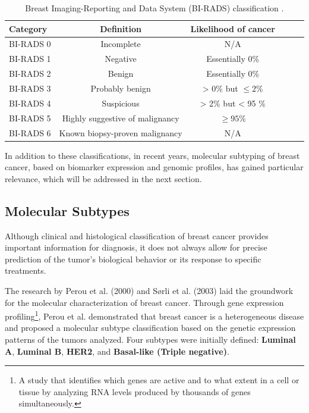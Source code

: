 \documentclass[a4paper,10pt]{book}
\begin{document}
\begin{table}[h!]
	\caption{Breast Imaging-Reporting and Data System (BI-RADS) classification \cite{noauthor_bi-rads_2025}.}
	\centering
	\begin{tabular}{lccccc}
		\toprule
		\textbf{Category} & \textbf{Definition} & \textbf{Likelihood of cancer}\\
		\midrule
		BI-RADS 0        & Incomplete                         & N/A \\
		BI-RADS 1        & Negative                           & Essentially 0\% \\
            BI-RADS 2        & Benign                             & Essentially 0\%  \\
            BI-RADS 3        & Probably benign                    & > 0\% but $\leq 2\%$ \\
            BI-RADS 4        & Suspicious                         & > 2\% but < 95 \% \\
            BI-RADS 5        & Highly suggestive of malignancy    & $\geq 95\%$ \\
            BI-RADS 6        & Known biopsy-proven malignancy     & N/A \\
		\bottomrule
	\end{tabular}
	\label{tab:birads_table}
\end{table}


In addition to these classifications, in recent years, molecular subtyping of breast cancer, based on biomarker expression and genomic profiles, has gained particular relevance, which will be addressed in the next section.


\subsection{Molecular Subtypes}

Although clinical and histological classification of breast cancer provides important information for diagnosis, it does not always allow for precise prediction of the tumor’s biological behavior or its response to specific treatments.

The research by Perou et al. (2000) \cite{perou_molecular_2000} and Sørli et al. (2003) \cite{sorlie_repeated_2003} laid the groundwork for the molecular characterization of breast cancer. Through gene expression profiling\footnote{A study that identifies which genes are active and to what extent in a cell or tissue by analyzing RNA levels produced by thousands of genes simultaneously.}, Perou et al. demonstrated that breast cancer is a heterogeneous disease and proposed a molecular subtype classification based on the genetic expression patterns of the tumors analyzed. Four subtypes were initially defined: \textbf{Luminal A}, \textbf{Luminal B}, \textbf{HER2}, and \textbf{Basal-like (Triple negative)}.
\end{document}
